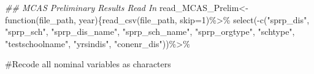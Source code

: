 \documentclass[
  letterpaper,
  DIV=11,
  numbers=noendperiod]{scrartcl}
\newenvironment{Shaded}{\begin{snugshade}}{\end{snugshade}}
\newcommand{\AttributeTok}[1]{\textcolor[rgb]{0.40,0.45,0.13}{#1}}
\newcommand{\CommentTok}[1]{\textcolor[rgb]{0.37,0.37,0.37}{#1}}
\newcommand{\ControlFlowTok}[1]{\textcolor[rgb]{0.00,0.23,0.31}{#1}}
\newcommand{\DecValTok}[1]{\textcolor[rgb]{0.68,0.00,0.00}{#1}}
\newcommand{\DocumentationTok}[1]{\textcolor[rgb]{0.37,0.37,0.37}{\textit{#1}}}
\newcommand{\FunctionTok}[1]{\textcolor[rgb]{0.28,0.35,0.67}{#1}}
\newcommand{\NormalTok}[1]{\textcolor[rgb]{0.00,0.23,0.31}{#1}}
\newcommand{\OtherTok}[1]{\textcolor[rgb]{0.00,0.23,0.31}{#1}}
\newcommand{\SpecialCharTok}[1]{\textcolor[rgb]{0.37,0.37,0.37}{#1}}
\newcommand{\StringTok}[1]{\textcolor[rgb]{0.13,0.47,0.30}{#1}}
\begin{document}
\begin{Shaded}
\begin{Highlighting}[]
\DocumentationTok{\#\# MCAS Preliminary Results Read In}
\NormalTok{read\_MCAS\_Prelim}\OtherTok{\textless{}{-}}\ControlFlowTok{function}\NormalTok{(file\_path, year)\{}\FunctionTok{read\_csv}\NormalTok{(file\_path,}
                    \AttributeTok{skip=}\DecValTok{1}\NormalTok{)}\SpecialCharTok{\%\textgreater{}\%}
  \FunctionTok{select}\NormalTok{(}\SpecialCharTok{{-}}\FunctionTok{c}\NormalTok{(}\StringTok{"sprp\_dis"}\NormalTok{, }\StringTok{"sprp\_sch"}\NormalTok{, }\StringTok{"sprp\_dis\_name"}\NormalTok{, }\StringTok{"sprp\_sch\_name"}\NormalTok{, }\StringTok{"sprp\_orgtype"}\NormalTok{,}
  \StringTok{"schtype"}\NormalTok{, }\StringTok{"testschoolname"}\NormalTok{, }\StringTok{"yrsindis"}\NormalTok{, }\StringTok{"conenr\_dis"}\NormalTok{))}\SpecialCharTok{\%\textgreater{}\%}

\CommentTok{\#Recode all nominal variables as characters}
  

\end{Highlighting}
\end{Shaded}
\end{document}
